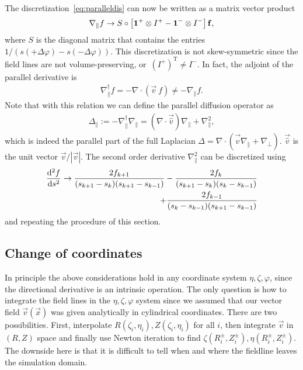 The discretization~\eqref{eq:paralleldis} can now be written as a matrix vector product
\begin{align}
    \nabla_\parallel f \rightarrow S \circ \left[ \mathbf{1}^+\otimes I^+ - \mathbf{1}^- \otimes I^-  \right] {\mathbf{f}}, 
    \label{}
\end{align}
where $S$ is the diagonal matrix that contains the entries $1/(s(+\Delta\varphi) - s(-\Delta\varphi))$.
This discretization is not skew-symmetric since the
field lines are not volume-preserving, or~$(I^+)^\mathrm{T} \neq I^-$.
In fact, the adjoint of the parallel derivative is
\begin{align}
    \nabla_\parallel^\dagger f = - \nabla\cdot(\vec v\ f ) \neq -\nabla_\parallel f.
    \label{}
\end{align}
Note that with this relation we can define the parallel 
diffusion operator as
\begin{align}
    \Delta_\parallel := -\nabla_\parallel^\dagger \nabla_\parallel = (\nabla\cdot \vec{ \hat v}) \nabla_\parallel + \nabla_\parallel^2 , 
    \label{}
\end{align}
which is indeed the parallel part of the full Laplacian $\Delta = \nabla\cdot( \vec{ \hat v} \nabla_\parallel + \nabla_\perp)$.
$\vec{ \hat v} $ is the unit vector $\vec v/ |\vec v|$.
The second order derivative $\nabla_\parallel^2$ can be 
discretized using 
\begin{align}
    \frac{\mathrm{d}^2 f}{\mathrm{d} s^2} \rightarrow  
    \frac{2f_{k+1} }{(s_{k+1}-s_k)(s_{k+1}-s_{k-1})} -
    \frac{2f_k}{(s_{k+1}-s_k)(s_k - s_{k-1})} \nonumber\\ + 
    \frac{2f_{k-1} }{(s_{k}-s_{k-1})(s_{k+1}-s_{k-1})} 
    \label{}
\end{align}
and repeating the procedure of this section.
\subsection{Change of coordinates}
In principle the above considerations hold in any
coordinate system $\eta,\zeta,\varphi$, since the directional derivative is 
an intrinsic operation.
The only question is how to integrate the field lines in the 
$\eta, \zeta,\varphi$ system 
since we assumed that our vector field $\vec v(\vec x)$ was given 
analytically in 
cylindrical coordinates. There are two possibilities. 
First, interpolate $R(\zeta_i, \eta_i), Z(\zeta_i, \eta_i)$ for 
all $i$, then integrate $\vec v$ in $(R,Z)$ space and finally use
Newton iteration to find $\zeta(R^\pm_i, Z^\pm_i), \eta(R^\pm_i, Z^\pm_i)$. 
The downside here is that it is difficult to tell when and where the fieldline leaves the simulation domain.

